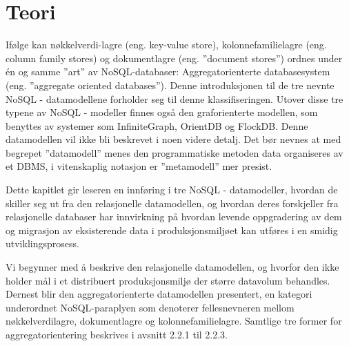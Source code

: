 
\chapter{Teori}

Ifølge \cite{sadalage2013} kan nøkkelverdi-lagre (eng. key-value store), kolonnefamilielagre (eng. column family stores) og dokumentlagre (eng. ''document stores'') ordnes under én og samme ''art'' av NoSQL-databaser: Aggregatorienterte databasesystem (eng. ''aggregate oriented databases''). Denne introduksjonen til de tre nevnte NoSQL - datamodellene forholder seg til denne klassifiseringen. Utover disse tre typene av NoSQL - modeller finnes også den graforienterte modellen, som benyttes av systemer som InfiniteGraph, OrientDB og FlockDB. Denne datamodellen vil ikke bli beskrevet i noen videre detalj. Det bør nevnes at med begrepet ''datamodell'' menes den programmatiske metoden data organiseres av et DBMS, i vitenskaplig notasjon er ''metamodell'' mer presist.

Dette kapitlet gir leseren en innføring i tre NoSQL - datamodeller, hvordan de skiller seg ut fra den relasjonelle datamodellen, og hvordan deres forskjeller fra relasjonelle databaser har innvirkning på hvordan levende oppgradering av dem og migrasjon av eksisterende data i produksjonsmiljøet kan utføres i en smidig utviklingsprosess.

Vi begynner med å beskrive den relasjonelle datamodellen, og hvorfor den ikke holder mål i et distribuert produksjonsmiljø der større datavolum behandles. Dernest blir den aggregatorienterte datamodellen presentert, en kategori underordnet NoSQL-paraplyen som denoterer fellesnevneren mellom nøkkelverdilagre, dokumentlagre og kolonnefamilielagre. Samtlige tre former for aggregatorientering beskrives i avsnitt 2.2.1 til 2.2.3.








\cleardoublepage


